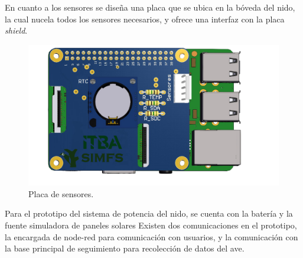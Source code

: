 En cuanto a los sensores se diseña una placa que se ubica en la bóveda del nido, la cual nucela todos los sensores necesarios, y ofrece una interfaz con la placa \textit{shield}.
\begin{figure}[H]
	\centering
	\includegraphics[width=0.9\linewidth,page=2]{ImagenesConstruccion del prototipo/shieldSensor}		
	\caption{Placa de sensores.}
	\label{fig:sens}
\end{figure}
Para el prototipo del sistema de potencia del nido, se cuenta con la batería \TBC y la fuente simuladora de paneles solares \TBC 
{}
Existen dos comunicaciones en el prototipo, la encargada de node-red para comunicación con usuarios, y la comunicación con la base principal de seguimiento para recolección de datos del ave.

